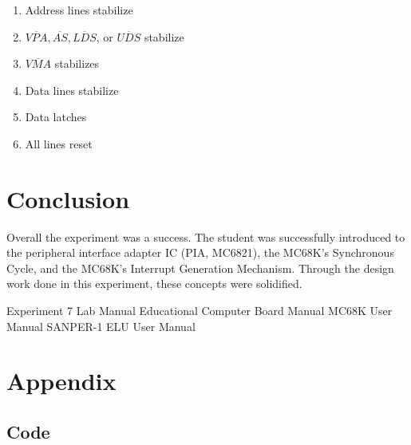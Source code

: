 \documentclass[12pt,Letter]{article}
\begin{document}
\begin{enumerate}
	 \item Address lines stabilize
	 \item $\overline{VPA}, \overline{AS}, \overline{LDS}$, or $\overline{UDS}$ stabilize
	 \item $\overline{VMA}$ stabilizes
	 \item Data lines stabilize
	 \item Data latches
	 \item All lines reset
\end{enumerate}
\section{Conclusion} 
Overall the experiment was a success. The student was successfully introduced to the peripheral interface adapter IC (PIA, MC6821), the MC68K's Synchronous Cycle, and the MC68K's Interrupt Generation Mechanism. Through the design work done in this experiment, these concepts were solidified.
\begin{thebibliography}{1}
	 Experiment 7 Lab Manual
	 Educational Computer Board Manual
	MC68K User Manual
	SANPER-1 ELU User Manual
\end{thebibliography}
  

\section{Appendix}
\label{appendix}
\subsection{Code}\label{code}

\end{document}
